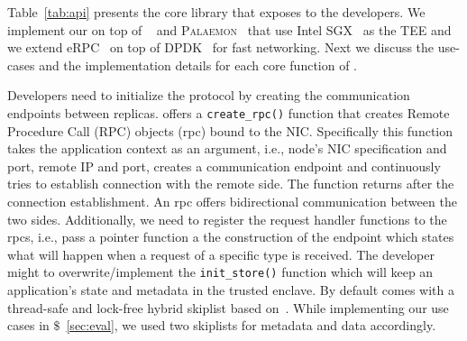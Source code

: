 Table~\ref{tab:api} presents the core library that \projecttitle{} exposes to the developers. We implement our \projecttitle{} on top of \scone~\cite{arnautov2016scone} and \textsc{Palaemon}~\cite{palaemon} that use Intel SGX~\cite{intel-sgx} as the TEE and we extend eRPC~\cite{erpc} on top of DPDK~\cite{dpdk} for fast networking. Next we discuss the use-cases and the implementation details for each core function of \projecttitle{}.


 Developers need to initialize the protocol by creating the communication endpoints between replicas. \projecttitle{} offers a \texttt{create\_rpc()} function that creates Remote Procedure Call (RPC) objects (rpc) bound to the NIC. Specifically this function takes the application context as an argument, i.e., node's NIC specification and port, remote IP and port, creates a communication endpoint and continuously tries to establish connection with the remote side. The function returns after the connection establishment. An rpc offers bidirectional communication between the two sides. Additionally, we need to register the request handler functions to the rpcs, i.e., pass a pointer function a the construction of the endpoint which states what will happen when a request of a specific type is received. The developer might to overwrite/implement the \texttt{init\_store()} function which will keep an application's state and metadata in the trusted enclave. By default \projecttitle{} comes with a thread-safe and lock-free hybrid skiplist based on~\cite{avocado, folly}. While implementing our use cases in $\$$~\ref{sec:eval}, we used two  \projecttitle{} skiplists for metadata and data accordingly.  %

